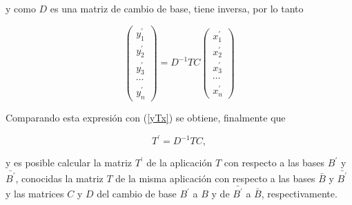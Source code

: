 \bigskip

\noindent
y como $D$ es una matriz de cambio de base, tiene inversa, por lo tanto


$$\left(\begin{array}{c} y^{\prime}_{1} \\ y^{\prime}_{2}  
\\  y^{\prime}_3 \\ \cdots \\ y^{\prime}_{n} 
\end{array} \right)=D^{-1}TC\left(\begin{array}{c} x^{\prime}_{1} \\ x^{\prime}_{2}  
\\  x^{\prime}_3 \\ \cdots \\ x^{\prime}_{n} 
\end{array} \right)$$

\bigskip

\noindent
Comparando esta expresión con (\ref{yTx}) se obtiene, finalmente que 

$$T^{\prime}= D^{-1}TC,$$

\bigskip

\noindent
y es posible  calcular la matriz $T^{\prime}$ de la aplicación  $T$ con respecto a las bases $B^{\prime}$ y $\bar{B^{\prime}}$, conocidas la matriz $T$ de la misma aplicación con respecto a las bases $\bar{B}$ y $\bar{B^{\prime}}$ y las matrices $C$ y $D$ del cambio de base $B^{\prime}$ a $B$ y de $\bar{B^{\prime}}$ a $\bar{B}$, respectivamente.

\newpage

